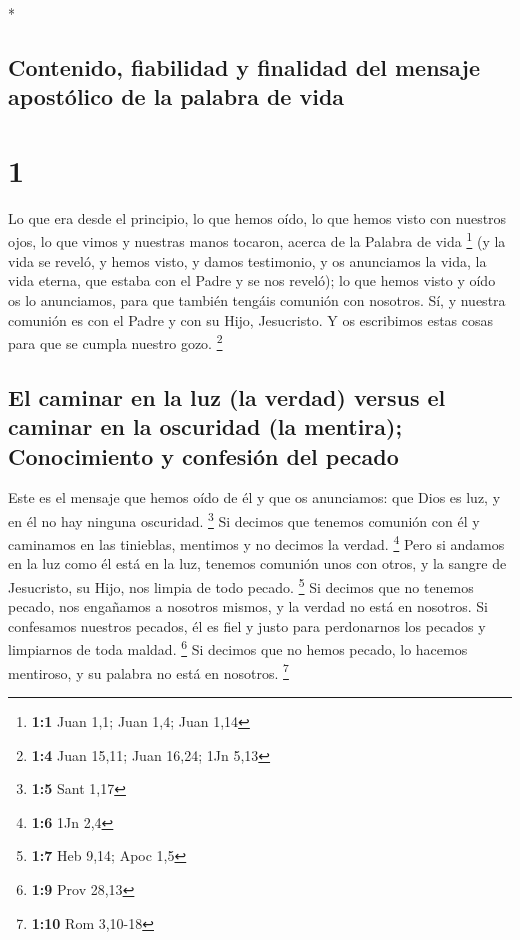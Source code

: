 \begin{paracol}{2} \switchcolumn[0]*

\hypertarget{contenido-fiabilidad-y-finalidad-del-mensaje-apostuxf3lico-de-la-palabra-de-vida}{%
\subsection{Contenido, fiabilidad y finalidad del mensaje apostólico de
la palabra de
vida}\label{contenido-fiabilidad-y-finalidad-del-mensaje-apostuxf3lico-de-la-palabra-de-vida}}

\hypertarget{section}{%
\section{1}\label{section}}

 Lo que era desde el principio, lo que hemos oído, lo que
hemos visto con nuestros ojos, lo que vimos y nuestras manos tocaron,
acerca de la Palabra de vida \footnote{\textbf{1:1} Juan 1,1; Juan 1,4;
  Juan 1,14}  (y la vida se reveló, y hemos visto, y damos
testimonio, y os anunciamos la vida, la vida eterna, que estaba con el
Padre y se nos reveló);  lo que hemos visto y oído os lo
anunciamos, para que también tengáis comunión con nosotros. Sí, y
nuestra comunión es con el Padre y con su Hijo, Jesucristo.
 Y os escribimos estas cosas para que se cumpla nuestro
gozo. \footnote{\textbf{1:4} Juan 15,11; Juan 16,24; 1Jn 5,13}

\hypertarget{el-caminar-en-la-luz-la-verdad-versus-el-caminar-en-la-oscuridad-la-mentira-conocimiento-y-confesiuxf3n-del-pecado}{%
\subsection{El caminar en la luz (la verdad) versus el caminar en la
oscuridad (la mentira); Conocimiento y confesión del
pecado}\label{el-caminar-en-la-luz-la-verdad-versus-el-caminar-en-la-oscuridad-la-mentira-conocimiento-y-confesiuxf3n-del-pecado}}

 Este es el mensaje que hemos oído de él y que os
anunciamos: que Dios es luz, y en él no hay ninguna oscuridad.
\footnote{\textbf{1:5} Sant 1,17}  Si decimos que tenemos
comunión con él y caminamos en las tinieblas, mentimos y no decimos la
verdad. \footnote{\textbf{1:6} 1Jn 2,4}  Pero si andamos
en la luz como él está en la luz, tenemos comunión unos con otros, y la
sangre de Jesucristo, su Hijo, nos limpia de todo pecado. \footnote{\textbf{1:7}
  Heb 9,14; Apoc 1,5}  Si decimos que no tenemos pecado,
nos engañamos a nosotros mismos, y la verdad no está en nosotros.
 Si confesamos nuestros pecados, él es fiel y justo para
perdonarnos los pecados y limpiarnos de toda maldad. \footnote{\textbf{1:9}
  Prov 28,13}  Si decimos que no hemos pecado, lo hacemos
mentiroso, y su palabra no está en nosotros. \footnote{\textbf{1:10} Rom
  3,10-18}


\end{paracol}

